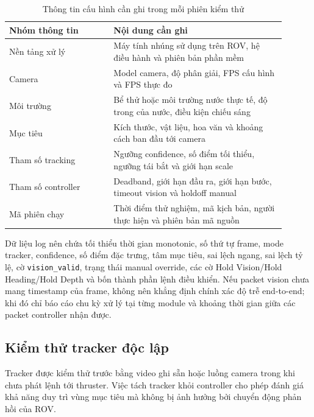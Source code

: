 \documentclass[../DoAn.tex]{subfiles}
\begin{document}
\begin{table}[htbp]
    \centering
    \caption{Thông tin cấu hình cần ghi trong mỗi phiên kiểm thử}
    \label{tab:kiemthu_cauhinh}
    \renewcommand{\arraystretch}{1.25}
    \begin{tabular}{|p{0.34\linewidth}|p{0.56\linewidth}|}
        \hline
        \textbf{Nhóm thông tin} & \textbf{Nội dung cần ghi} \\
        \hline
        Nền tảng xử lý & Máy tính nhúng sử dụng trên ROV, hệ điều hành và phiên bản phần mềm \\
        \hline
        Camera & Model camera, độ phân giải, FPS cấu hình và FPS thực đo \\
        \hline
        Môi trường & Bể thử hoặc môi trường nước thực tế, độ trong của nước, điều kiện chiếu sáng \\
        \hline
        Mục tiêu & Kích thước, vật liệu, hoa văn và khoảng cách ban đầu tới camera \\
        \hline
        Tham số tracking & Ngưỡng confidence, số điểm tối thiểu, ngưỡng tái bắt và giới hạn scale \\
        \hline
        Tham số controller & Deadband, giới hạn đầu ra, giới hạn bước, timeout vision và holdoff manual \\
        \hline
        Mã phiên chạy & Thời điểm thử nghiệm, mã kịch bản, người thực hiện và phiên bản mã nguồn \\
        \hline
    \end{tabular}
\end{table}

Dữ liệu log nên chứa tối thiểu thời gian monotonic, số thứ tự frame, mode tracker, confidence, số điểm đặc trưng, tâm mục tiêu, sai lệch ngang, sai lệch tỷ lệ, cờ \texttt{vision\_valid}, trạng thái manual override, các cờ Hold Vision/Hold Heading/Hold Depth và bốn thành phần lệnh điều khiển. Nếu packet vision chưa mang timestamp của frame, không nên khẳng định chính xác độ trễ end-to-end; khi đó chỉ báo cáo chu kỳ xử lý tại từng module và khoảng thời gian giữa các packet controller nhận được.

\subsection{Kiểm thử tracker độc lập}

Tracker được kiểm thử trước bằng video ghi sẵn hoặc luồng camera trong khi chưa phát lệnh tới thruster. Việc tách tracker khỏi controller cho phép đánh giá khả năng duy trì vùng mục tiêu mà không bị ảnh hưởng bởi chuyển động phản hồi của ROV.
\end{document}
